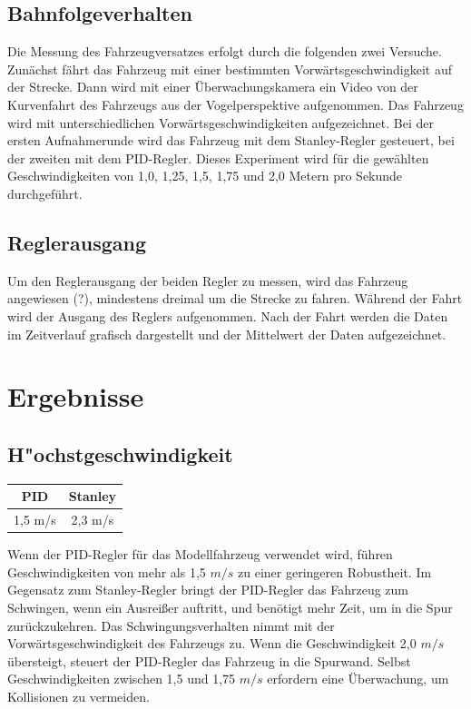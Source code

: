 \documentclass[arbeit=studie,oneside,BCOR=12mm]{ArbeitRST}
\begin{document}
\subsection{Bahnfolgeverhalten}

Die Messung des Fahrzeugversatzes erfolgt durch die folgenden zwei Versuche.
Zunächst fährt das Fahrzeug mit einer bestimmten Vorwärtsgeschwindigkeit auf
der Strecke. Dann wird mit einer Überwachungskamera ein Video von der
Kurvenfahrt des Fahrzeugs aus der Vogelperspektive aufgenommen. Das Fahrzeug
wird mit unterschiedlichen Vorwärtsgeschwindigkeiten aufgezeichnet. Bei der
ersten Aufnahmerunde wird das Fahrzeug mit dem Stanley-Regler gesteuert, bei
der zweiten mit dem PID-Regler. Dieses Experiment wird für die gewählten
Geschwindigkeiten von 1,0, 1,25, 1,5, 1,75 und 2,0 Metern pro Sekunde
durchgeführt.

\subsection{Reglerausgang}

Um den Reglerausgang der beiden Regler zu messen, wird das Fahrzeug angewiesen
(?), mindestens dreimal um die Strecke zu fahren. Während der Fahrt wird der
Ausgang des Reglers aufgenommen. Nach der Fahrt werden die Daten im Zeitverlauf
grafisch dargestellt und der Mittelwert der Daten aufgezeichnet. 

\section{Ergebnisse}

\subsection{H"ochstgeschwindigkeit}
\begin{center}
\begin{tabular}{|c|c|}
\hline
    PID & Stanley \\
\hline
\hline
    1,5 m/s & 2,3 m/s \\
\hline
\end{tabular}
\end{center}

Wenn der PID-Regler für das Modellfahrzeug verwendet wird, führen
Geschwindigkeiten von mehr als 1,5 $m/s$ zu einer geringeren Robustheit. Im
Gegensatz zum Stanley-Regler bringt der PID-Regler das Fahrzeug zum Schwingen,
wenn ein Ausreißer auftritt, und benötigt mehr Zeit, um in die Spur
zurückzukehren. Das Schwingungsverhalten nimmt mit der Vorwärtsgeschwindigkeit
des Fahrzeugs zu. Wenn die Geschwindigkeit 2,0 $m/s$ übersteigt, steuert der
PID-Regler das Fahrzeug in die Spurwand. Selbst Geschwindigkeiten zwischen 1,5
und 1,75 $m/s$ erfordern eine Überwachung, um Kollisionen zu vermeiden.
\end{document}

